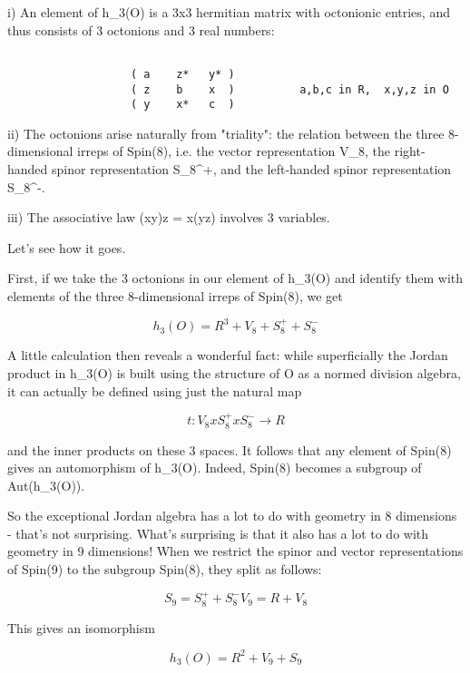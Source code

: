 i) An element of h_{3}(O) is a 3x3 hermitian matrix with octonionic
entries, and thus consists of 3 octonions and 3 real numbers:


\begin{verbatim}

                   ( a    z*   y* )
                   ( z    b    x  )          a,b,c in R,  x,y,z in O
                   ( y    x*   c  )            
\end{verbatim}
    
ii) The octonions arise naturally from "triality": the
relation between the three 8-dimensional irreps of Spin(8), i.e. the
vector representation V_{8}, the right-handed spinor
representation S_{8}^{+}, and the left-handed spinor
representation S_{8}^{-}.

iii) The associative law (xy)z = x(yz) involves 3 variables.

Let's see how it goes.


First, if we take the 3 octonions in our element of h_{3}(O) and
identify them with elements of the three 8-dimensional irreps of
Spin(8), we get


$$

h_{3}(O) = R^{3}  +  V_{8}  +  S_{8}^{+}  +  S_{8}^{-} 
$$
    

A little calculation then reveals a wonderful fact: while superficially
the Jordan product in h_{3}(O) is built using the structure of O
as a normed division algebra, it can actually be defined using just the
natural map


$$

t: V_{8}  x  S_{8}^{+}  x  S_{8}^{-} \to  R
$$
    

and the inner products on these 3 spaces.  It follows that any element
of Spin(8) gives an automorphism of h_{3}(O).  Indeed, Spin(8)
becomes a subgroup of Aut(h_{3}(O)).

So the exceptional Jordan algebra has a lot to do with geometry in 8
dimensions - that's not surprising.  What's surprising is that it also
has a lot to do with geometry in 9 dimensions!  When we restrict the
spinor and vector representations of Spin(9) to the subgroup Spin(8),
they split as follows:


$$

S_{9} = S_{8}^{+}  +  S_{8}^{-}

V_{9} = R  +  V_{8}
$$
    
This gives an isomorphism


$$

h_{3}(O) = R^{2}  +  V_{9}  +  S_{9}
$$
    
